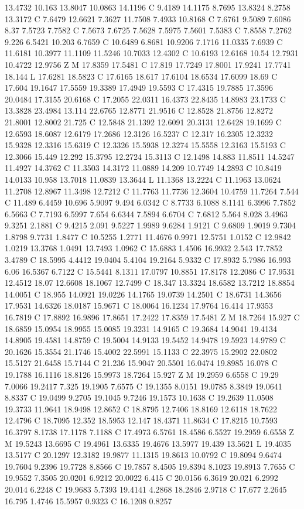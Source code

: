 {{13.4732 10.163 13.8047 10.0863 14.1196 C 9.4189 14.1175 8.7695 13.8324 8.2758 13.3172 C 7.6479 12.6621 7.3627 11.7508 7.4933 10.8168 C 7.6761 9.5089 7.6086 8.37 7.5723 7.7582 C 7.5673 7.6725 7.5628 7.5975 7.5601 7.5383 C 7.8558 7.2762 9.226 6.5421 10.203 6.7659 C 10.6489 6.8681 10.9206 7.1716 11.0335 7.6939 C 11.6181 10.3977 11.1109 11.5246 10.7033 12.4302 C 10.6193 12.6168 10.54 12.7931 10.4722 12.9756 Z M 17.8359 17.5481 C 17.819 17.7249 17.8001 17.9241 17.7741 18.144 L 17.6281 18.5823 C 17.6165 18.617 17.6104 18.6534 17.6099 18.69 C 17.604 19.1647 17.5559 19.3389 17.4949 19.5593 C 17.4315 19.7885 17.3596 20.0484 17.3155 20.6168 C 17.2055 22.0311 16.4373 22.8435 14.8983 23.1733 C 13.3828 23.4984 13.114 22.6765 12.8771 21.9516 C 12.8528 21.8756 12.8272 21.8001 12.8002 21.725 C 12.5848 21.1392 12.6091 20.3131 12.6428 19.1699 C 12.6593 18.6087 12.6179 17.2686 12.3126 16.5237 C 12.317 16.2305 12.3232 15.9328 12.3316 15.6319 C 12.3326 15.5938 12.3274 15.5558 12.3163 15.5193 C 12.3066 15.449 12.292 15.3795 12.2724 15.3113 C 12.1498 14.883 11.8511 14.5247 11.4927 14.3762 C 11.3503 14.3172 11.0889 14.209 10.7749 14.2893 C 10.8419 14.0133 10.958 13.7018 11.0839 13.3644 L 11.1368 13.2224 C 11.1963 13.0624 11.2708 12.8967 11.3498 12.7212 C 11.7763 11.7736 12.3604 10.4759 11.7264 7.544 C 11.489 6.4459 10.696 5.9097 9.494 6.0342 C 8.7733 6.1088 8.1141 6.3996 7.7852 6.5663 C 7.7193 6.5997 7.654 6.6344 7.5894 6.6704 C 7.6812 5.564 8.028 3.4963 9.3251 2.1881 C 9.4215 2.091 9.5227 1.9989 9.6284 1.9121 C 9.6809 1.9019 9.7304 1.8798 9.7731 1.8477 C 10.5255 1.2771 11.4676 0.9971 12.5751 1.0152 C 12.9842 1.0219 13.3768 1.0491 13.7493 1.0962 C 15.6883 1.4506 16.9932 2.543 17.7852 3.4789 C 18.5995 4.4412 19.0404 5.4104 19.2164 5.9332 C 17.8932 5.7986 16.993 6.06 16.5367 6.7122 C 15.5441 8.1311 17.0797 10.8851 17.8178 12.2086 C 17.9531 12.4512 18.07 12.6608 18.1067 12.7499 C 18.347 13.3324 18.6582 13.7212 18.8854 14.0051 C 18.955 14.0921 19.0226 14.1765 19.0739 14.2501 C 18.6731 14.3656 17.9531 14.6326 18.0187 15.9671 C 18.0064 16.1234 17.9764 16.414 17.9353 16.7819 C 17.8892 16.9896 17.8651 17.2422 17.8359 17.5481 Z M 18.7264 15.927 C 18.6859 15.0954 18.9955 15.0085 19.3231 14.9165 C 19.3684 14.9041 19.4134 14.8905 19.4581 14.8759 C 19.5004 14.9133 19.5452 14.9478 19.5923 14.9789 C 20.1626 15.3554 21.1746 15.4002 22.5991 15.1133 C 22.3975 15.2902 22.0802 15.5127 21.6458 15.7144 C 21.236 15.9047 20.5501 16.0474 19.8985 16.078 C 19.1788 16.1116 18.8126 15.9973 18.7264 15.927 Z M 19.2959 6.6558 C 19.29 7.0066 19.2417 7.325 19.1905 7.6575 C 19.1355 8.0151 19.0785 8.3849 19.0641 8.8337 C 19.0499 9.2705 19.1045 9.7246 19.1573 10.1638 C 19.2639 11.0508 19.3733 11.9641 18.9498 12.8652 C 18.8795 12.7406 18.8169 12.6118 18.7622 12.4796 C 18.7095 12.352 18.5953 12.147 18.4371 11.8634 C 17.8215 10.7593 16.3797 8.1738 17.1178 7.1188 C 17.4973 6.5761 18.4586 6.5527 19.2959 6.6558 Z M 19.5243 13.6695 C 19.4961 13.6335 19.4676 13.5977 19.439 13.5621 L 19.4035 13.5177 C 20.1297 12.3182 19.9877 11.1315 19.8613 10.0792 C 19.8094 9.6474 19.7604 9.2396 19.7728 8.8566 C 19.7857 8.4505 19.8394 8.1023 19.8913 7.7655 C 19.9552 7.3505 20.0201 6.9212 20.0022 6.415 C 20.0156 6.3619 20.021 6.2992 20.014 6.2248 C 19.9683 5.7393 19.4141 4.2868 18.2846 2.9718 C 17.677 2.2645 16.795 1.4746 15.5957 0.9323 C 16.1208 0.8257 }}

